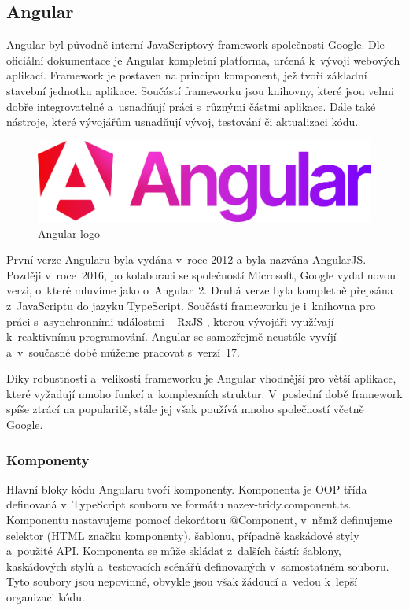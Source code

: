 \subsection{Angular}

Angular byl původně interní JavaScriptový framework společnosti Google. 
Dle oficiální dokumentace \cite{angulario} je Angular kompletní platforma, určená k~vývoji webových aplikací. 
Framework je postaven na principu komponent, jež tvoří základní stavební jednotku aplikace. 
Součástí frameworku jsou knihovny, které jsou velmi dobře integrovatelné a~usnadňují práci s~různými částmi aplikace. 
Dále také nástroje, které vývojářům usnadňují vývoj, testování či aktualizaci kódu.\cite{angulario,learningangular}

\begin{figure}[htb]
	\centering
		\includegraphics[width=.5\textwidth]{images/angular-logo.png}
	\caption[Angular logo]{Angular logo \cite{angulardev}}
	\label{fig:angularlogo}
\end{figure}

První verze Angularu byla vydána v~roce 2012 a byla nazvána AngularJS. 
Později v~roce~2016, po kolaboraci se společností Microsoft, Google vydal novou verzi, o~které mluvíme jako o~Angular~2. 
Druhá verze byla kompletně přepsána z~JavaScriptu do jazyku TypeScript. 
Součástí frameworku je i~knihovna pro práci s~asynchronními událostmi -- RxJS \cite{rxjslibrary}, kterou vývojáři využívají k~reaktivnímu programování. 
Angular se samozřejmě neustále vyvíjí a~v~současné době můžeme pracovat s~verzí~17.\cite{angulardev,learningangular}

Díky robustnosti a~velikosti frameworku je Angular vhodnější pro větší aplikace, které vyžadují mnoho funkcí a~komplexních struktur. 
V~poslední době framework spíše ztrácí na popularitě, stále jej však používá mnoho společností včetně Google.\cite{learningangular}

\subsubsection{Komponenty}

Hlavní bloky kódu Angularu tvoří komponenty. Komponenta je OOP třída definovaná v~TypeScript souboru ve formátu nazev-tridy.component.ts. 
Komponentu nastavujeme pomocí dekorátoru @Component, v~němž definujeme selektor (HTML značku komponenty), šablonu, případně kaskádové styly a~použité API. 
Komponenta se může skládat z~dalších částí: šablony, kaskádových stylů a~testovacích scénářů definovaných v~samostatném souboru. 
Tyto soubory jsou nepovinné, obvykle jsou však žádoucí a~vedou k~lepší organizaci kódu. 

